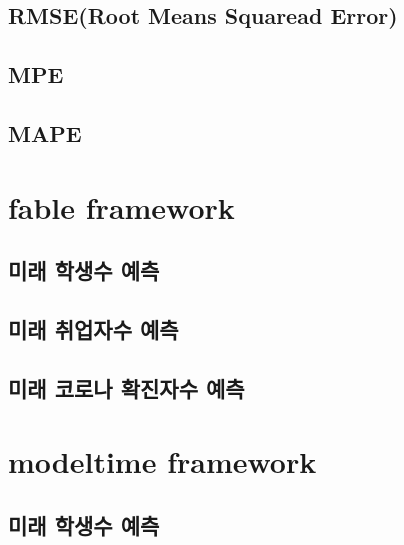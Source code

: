\documentclass[
]{book}
\begin{document}
\hypertarget{rmseroot-means-squaread-error}{%
\subsection{RMSE(Root Means Squaread Error)}\label{rmseroot-means-squaread-error}}

\hypertarget{mpe}{%
\subsection{MPE}\label{mpe}}

\hypertarget{mape}{%
\subsection{MAPE}\label{mape}}

\hypertarget{fable-framework}{%
\section{fable framework}\label{fable-framework}}

\hypertarget{uxbbf8uxb798-uxd559uxc0dduxc218-uxc608uxce21}{%
\subsection{미래 학생수 예측}\label{uxbbf8uxb798-uxd559uxc0dduxc218-uxc608uxce21}}

\hypertarget{uxbbf8uxb798-uxcde8uxc5c5uxc790uxc218-uxc608uxce21}{%
\subsection{미래 취업자수 예측}\label{uxbbf8uxb798-uxcde8uxc5c5uxc790uxc218-uxc608uxce21}}

\hypertarget{uxbbf8uxb798-uxcf54uxb85cuxb098-uxd655uxc9c4uxc790uxc218-uxc608uxce21}{%
\subsection{미래 코로나 확진자수 예측}\label{uxbbf8uxb798-uxcf54uxb85cuxb098-uxd655uxc9c4uxc790uxc218-uxc608uxce21}}

\hypertarget{modeltime-framework}{%
\section{modeltime framework}\label{modeltime-framework}}

\hypertarget{uxbbf8uxb798-uxd559uxc0dduxc218-uxc608uxce21-1}{%
\subsection{미래 학생수 예측}\label{uxbbf8uxb798-uxd559uxc0dduxc218-uxc608uxce21-1}}
\end{document}

